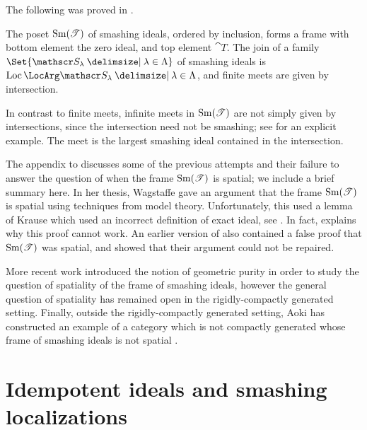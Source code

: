 \documentclass{amsart}
\begin{document}
    The following was proved in \cite[Theorem 5.5]{BalmerKrauseStevenson2020Frame}.
    \begin{Thm}
    The poset $\operatorname{Sm}(\mathscr{T})$ of smashing ideals, ordered by inclusion, forms a frame with bottom element the zero ideal, and top element $\cat T$. The join of a family $\Set{\cat S_\lambda  \given \lambda \in \Lambda}$ of smashing ideals is $\Loc{\cat S_\lambda \given \lambda \in \Lambda}$, and finite meets are given by intersection. 
    \end{Thm}
 \begin{Rem}
    In contrast to finite meets, infinite meets in $\operatorname{Sm}(\mathscr{T})$ are not simply given by intersections, since the intersection need not be smashing; see \cite[Remark~5.12]{BalmerKrauseStevenson2020Frame} for an explicit example. The meet is the largest smashing ideal contained in the intersection.
\end{Rem}  
    \begin{Rem}\label{rem:history}
        The appendix to \cite{BalchinStevenson21pp} discusses some of the previous attempts and their failure to answer the question of when the frame $\operatorname{Sm}(\mathscr{T})$ is spatial; we include a brief summary here. In her thesis, Wagstaffe \cite[Theorem 6.2.2]{Wagstaffe2021Definability} gave an argument that the frame $\operatorname{Sm}(\mathscr{T})$ is spatial using techniques from model theory. Unfortunately, this used a lemma of Krause \cite[Lemma 4.11]{Krause2000Smashing} which used an incorrect definition of exact ideal, see \cite[p.~1224]{Krause2005Cohomological}. In fact, \cite[Example A.2.3]{BalchinStevenson21pp} explains why this proof cannot work. An earlier version of \cite{BalchinStevenson21pp} also contained a false proof that $\operatorname{Sm}(\mathscr{T})$ was spatial, and \cite[Example A.2.2]{BalchinStevenson21pp} showed that their argument could not be repaired. 
        
        More recent work \cite{GomezEtAl2026Geometric} introduced the notion of geometric purity in order to study the question of spatiality of the frame of smashing ideals,  however the general question of spatiality has remained open in the rigidly-compactly generated setting. Finally, outside the rigidly-compactly generated setting, Aoki has constructed an example of a category which is not compactly generated whose frame of smashing ideals is not spatial \cite{aoki2024smashing}. 
    \end{Rem}
    \section{Idempotent ideals and smashing localizations}
\end{document}
